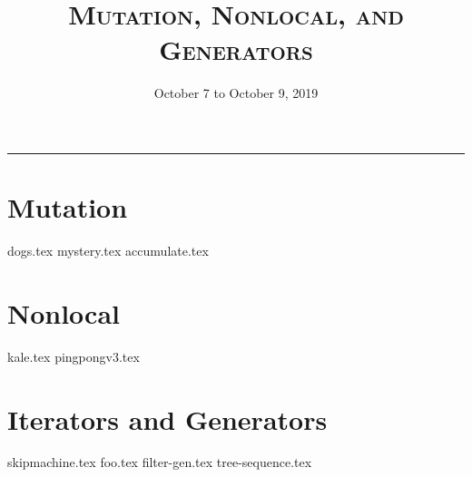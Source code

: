 \documentclass{exam}
\title{\textsc{Mutation, Nonlocal, and Generators}}
\date{October 7 to October 9, 2019}
\begin{document}
\maketitle
\rule{\textwidth}{0.15em}
\fontsize{12}{15}\selectfont

\section{Mutation}
\begin{questions}
{dogs.tex}
\newpage
{mystery.tex}
\newpage
{accumulate.tex}
\end{questions}

\newpage
\section{Nonlocal}
\begin{questions}
{kale.tex}
{pingpongv3.tex}
\end{questions}

\section{Iterators and Generators}
\begin{questions}
{skipmachine.tex}
{foo.tex}
{filter-gen.tex}
{tree-sequence.tex}
\end{questions}
\end{document}
